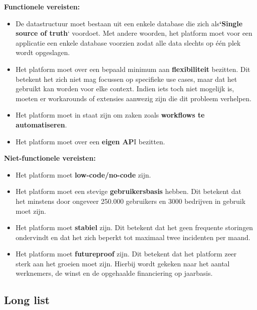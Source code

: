\textbf{Functionele vereisten:} %

\begin{itemize}
    \item De datastructuur moet bestaan uit een enkele database die zich als\textbf{`Single source of truth}` voordoet. Met andere woorden, het platform moet voor een applicatie een enkele database voorzien zodat alle data slechts op één plek wordt opgeslagen.
    \item Het platform moet over een bepaald minimum aan \textbf{flexibiliteit} bezitten. Dit betekent het zich niet mag focussen op specifieke use cases, maar dat het gebruikt kan worden voor elke context. Indien iets toch niet mogelijk is, moeten er workarounds of extensies aanwezig zijn die dit probleem verhelpen.
    \item Het platform moet in staat zijn om zaken zoals \textbf{workflows te automatiseren}.
    \item Het platform moet over een \textbf{eigen AP}I bezitten.
\end{itemize}

\textbf{Niet-functionele vereisten:} %

\begin{itemize}
    \item Het platform moet \textbf{low-code/no-code} zijn.
    \item Het platform moet een stevige \textbf{gebruikersbasis} hebben. Dit betekent dat het minstens door ongeveer 250.000 gebruikers en 3000 bedrijven in gebruik moet zijn.
    \item Het platform moet \textbf{stabiel} zijn. Dit betekent dat het geen frequente storingen ondervindt en dat het zich beperkt tot maximaal twee incidenten per maand.
    \item Het platform moet \textbf{futureproof} zijn. Dit betekent dat het platform zeer sterk aan het groeien moet zijn. Hierbij wordt gekeken naar het aantal werknemers, de winst en de opgehaalde financiering op jaarbasis.
\end{itemize}


\subsection{Long list}


